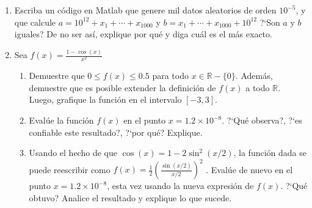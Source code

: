 \documentclass[12pt,letterpaper]{article}
\begin{document}
\begin{enumerate}
\item Escriba un c\'odigo en Matlab que genere mil datos aleatorios de orden $10^{-5}$, y que calcule $a = 10^{12} + x_1 + \cdots
+ x_{1000}$ y $b = x_1 + \cdots + x_{1000} + 10^{12}$ ?`Son $a$ y $b$ iguales? De no ser as\'i, explique por qu\'e y diga cu\'al es el m\'as exacto.

\item Sea $\displaystyle f(x)=\frac{1-\cos(x)}{x^2}$
\begin{enumerate}
 \item Demuestre que $0 \leq f(x) \leq 0.5$ para todo $x \in \mathbb{R} - \{0\}$. Adem\'as, demuestre que es posible extender la definici\'on de $f(x)$ a todo $\mathbb{R}$. Luego, grafique la funci\'on en el intervalo $[-3, 3]$.
\item Eval\'ue la funci\'on $f(x)$ en el punto $x = 1.2 \times 10^{-8}$. ?`Qu\'e observa?, ?`es confiable este resultado?, ?`por qu\'e? Explique.
\item Usando el hecho de que $\cos(x) = 1-2\sin^2(x/2)$, la funci\'on dada se puede reescribir como $f(x) = \displaystyle\frac{1}{2}\left(\frac{\sin(x/2)}{x/2}\right)^2$ . Eval\'ue de nuevo en el punto $x = 1.2 \times 10^{-8}$, esta vez usando la nueva expresi\'on de $f(x)$. ?`Qu\'e obtuvo? Analice el resultado y explique lo que sucede.


\end{enumerate}





\end{enumerate}
\end{document}
